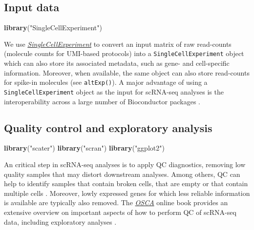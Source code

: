 \documentclass[9pt,a4paper,]{extarticle}
\newenvironment{Shaded}{\begin{snugshade}}{\end{snugshade}}
\newcommand{\KeywordTok}[1]{\textcolor[rgb]{0.13,0.29,0.53}{\textbf{#1}}}
\newcommand{\NormalTok}[1]{#1}
\newcommand{\StringTok}[1]{\textcolor[rgb]{0.31,0.60,0.02}{#1}}
\begin{document}
\hypertarget{input-data}{%
\subsection{Input data}\label{input-data}}

\begin{Shaded}
\begin{Highlighting}[]
\KeywordTok{library}\NormalTok{(}\StringTok{"SingleCellExperiment"}\NormalTok{)}
\end{Highlighting}
\end{Shaded}

We use \emph{\href{https://bioconductor.org/packages/3.11/SingleCellExperiment}{SingleCellExperiment}} to convert an input
matrix of raw read-counts (molecule counts for UMI-based protocols) into a
\texttt{SingleCellExperiment} object which can also store its associated
metadata, such as gene- and cell-specific information.
Moreover, when available, the same object can also store read-counts for
spike-in molecules (see \texttt{altExp()}).
A major advantage of using a \texttt{SingleCellExperiment} object as the input for
scRNA-seq analyses is the interoperability across a large number of
Bioconductor packages \citep{Amezquita2019}.

\hypertarget{quality-control-and-exploratory-analysis}{%
\subsection{Quality control and exploratory analysis}\label{quality-control-and-exploratory-analysis}}

\begin{Shaded}
\begin{Highlighting}[]
\KeywordTok{library}\NormalTok{(}\StringTok{"scater"}\NormalTok{)}
\KeywordTok{library}\NormalTok{(}\StringTok{"scran"}\NormalTok{)}
\KeywordTok{library}\NormalTok{(}\StringTok{"ggplot2"}\NormalTok{)}
\end{Highlighting}
\end{Shaded}

An critical step in scRNA-seq analyses is to apply QC diagnostics, removing low
quality samples that may distort downstream analyses.
Among others, QC can help to identify samples that contain broken cells, that
are empty or that contain multiple cells \citep{Ilicic2016}.
Moreover, lowly expressed genes for which less reliable information is
available are typically also removed.
The \href{https://osca.bioconductor.org/}{\emph{OSCA}} online book provides an extensive
overview on important aspects of how to perform QC of scRNA-seq data, including
exploratory analyses \citep{Amezquita2019}.
\end{document}
